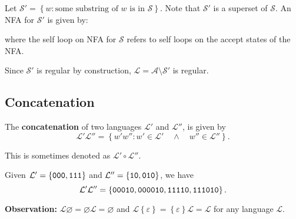 \documentclass{notes}
\begin{document}
\begin{prf}
  Let $\mathcal S' = \left \{ w : \text{some substring of $w$ is in $\mathcal S$} \right \}$.
  Note that $\mathcal S'$ is a superset of $\mathcal S$.
  An NFA for $\mathcal S'$ is given by: 
  
  \begin{center}
  \end{center}
  where the self loop on NFA for $\mathcal S$ refers to self loops on the accept states of the NFA.
  
  Since $\mathcal S'$ is regular by construction, $\mathcal L = \mathcal A \setminus \mathcal S'$ is regular.
\end{prf}

\newpage

\subsection{Concatenation}

\begin{defn}
  The {\boldmath \bfseries concatenation} of two languages $\mathcal L'$ and $\mathcal L''$, is given by 
  \[
    \mathcal L' \mathcal L'' = \left \{ w' w'' : w' \in \mathcal L' \quad \land \quad w'' \in \mathcal L'' \right \}.
  \]
  
  This is sometimes denoted as $\mathcal L' \circ \mathcal L''$.
\end{defn}

\begin{eg}
  Given $\mathcal L' = \left \{ \verb~000~, \verb~111~ \right \}$ and $\mathcal L'' = \left \{ \verb~10~, \verb~010~ \right \}$, we have 
  \[
    \mathcal L' \mathcal L'' = \left \{ \verb~00010~, \verb~000010~, \verb~11110~, \verb~111010~ \right \}.
  \]
\end{eg}

{\boldmath \bfseries Observation: } $\mathcal L \varnothing = \varnothing \mathcal L = \varnothing$ and $\mathcal L \left \{ \varepsilon \right \} = \left \{ \varepsilon \right \} \mathcal L = \mathcal L$ for any language $\mathcal L$.
\end{document}
